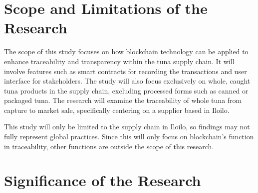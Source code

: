 \section{Scope and Limitations of the Research}
\label{sec:scopelimitations}

The scope of this study focuses on how blockchain technology can be applied to enhance traceability and transparency within the tuna supply chain. It will involve features such as smart contracts for recording the transactions and user interface for stakeholders. The study will also focus exclusively on whole, caught tuna products in the supply chain, excluding processed forms such as canned or packaged tuna. The research will examine the traceability of whole tuna from capture to market sale, specifically centering on a supplier based in Iloilo. 

This study will only be limited to the supply chain in Iloilo, so findings may not fully represent global practices. Since this will only focus on blockchain’s function in traceability, other functions are outside the scope of this research. 


\begin{comment}

%
%
Generally, one paragraph should be allotted for each of your research objectives.

Each paragraph contains a brief overview of the concept/theory and the purpose of doing the associated objective.

Each paragraph also includes a description of the scope/limitation of your study.

* Please refer to the slides for examples.

\end{comment}


\section{Significance of the Research}
\label{sec:significance}

